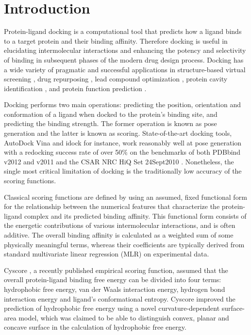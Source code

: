 \section{Introduction}

Protein-ligand docking is a computational tool that predicts how a ligand binds to a target protein and their binding affinity. Therefore docking is useful in elucidating intermolecular interactions and enhancing the potency and selectivity of binding in subsequent phases of the modern drug design process. Docking has a wide variety of pragmatic and successful applications in structure-based virtual screening \citep{1383}, drug repurposing \citep{1384}, lead compound optimization \citep{1385}, protein cavity identification \citep{1217}, and protein function prediction \citep{1386}.

Docking performs two main operations: predicting the position, orientation and conformation of a ligand when docked to the protein's binding site, and predicting the binding strength. The former operation is known as pose generation and the latter is known as scoring. State-of-the-art docking tools, AutoDock Vina \citep{595} and idock \citep{1153} for instance, work reasonably well at pose generation with a redocking success rate of over 50\% \citep{1362} on the benchmarks of both PDBbind v2012 and v2011 \citep{529,530} and the CSAR NRC HiQ Set 24Sept2010 \citep{857,960}. Nonetheless, the single most critical limitation of docking is the traditionally low accuracy of the scoring functions.

Classical scoring functions are defined by using an assumed, fixed functional form for the relationship between the numerical features that characterize the protein-ligand complex and its predicted binding affinity. This functional form consists of the energetic contributions of various intermolecular interactions, and is often additive. The overall binding affinity is calculated as a weighted sum of some physically meaningful terms, whereas their coefficients are typically derived from standard multivariate linear regression (MLR) on experimental data.

Cyscore \citep{1372}, a recently published empirical scoring function, assumed that the overall protein-ligand binding free energy can be divided into four terms: hydrophobic free energy, van der Waals interaction energy, hydrogen bond interaction energy and ligand's conformational entropy. Cyscore improved the prediction of hydrophobic free energy using a novel curvature-dependent surface-area model, which was claimed to be able to distinguish convex, planar and concave surface in the calculation of hydrophobic free energy.

